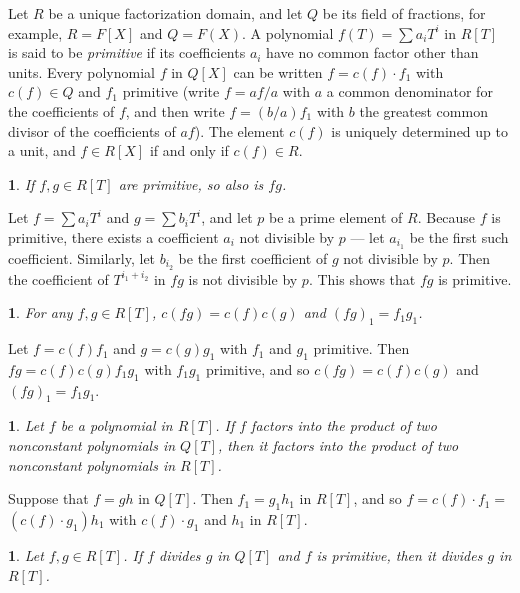 \documentclass[a4paper,11pt,final,openany]{memoir}
\newtheorem{E}[X]{}
\theoremstyle{nonumberplain}
\begin{document}
Let $R$ be a unique factorization domain, and let $Q$ be its field of
fractions, for example, $R=F[X]$ and $Q=F(X)$. A polynomial $f(T)=\sum
a_{i}T^{i}$ in $R[T]$ is said to be \emph{primitive}%
if its coefficients $a_{i}$ have no common factor other than units. Every
polynomial $f$ in $Q[X]$ can be written $f=c(f)\cdot f_{1}$ with $c(f)\in Q$
and $f_{1}$ primitive (write $f=af/a$ with $a$ a common denominator for the
coefficients of $f$, and then write $f=(b/a)f_{1}$ with $b$ the greatest
common divisor of the coefficients of $af$). The element $c(f)$ is uniquely
determined up to a unit, and $f\in R[X]$ if and only if $c(f)\in R$.

\begin{E}
\label{te16a}If $f,g\in R[T]$ are primitive, so also is $fg$.
\end{E}

\noindent Let $f=\sum a_{i}T^{i}$ and $g=\sum b_{i}T^{i}$, and let $p$ be a
prime element of $R$. Because $f$ is primitive, there exists a coefficient
$a_{i}$ not divisible by $p$ --- let $a_{i_{1}}$ be the first such
coefficient. Similarly, let $b_{i_{2}}$ be the first coefficient of $g$ not
divisible by $p$. Then the coefficient of $T^{i_{1}+i_{2}}$ in $fg$ is not
divisible by $p$. This shows that $fg$ is primitive.

\begin{E}
\label{te16b}For any $f,g\in R[T]$, $c(fg)=c(f)c(g)$ and $(fg)_{1}=f_{1}g_{1}$.
\end{E}

\noindent Let $f=c(f)f_{1}$ and $g=c(g)g_{1}$ with $f_{1}$ and $g_{1}$
primitive. Then $fg=c(f)c(g)f_{1}g_{1}$ with $f_{1}g_{1}$ primitive, and so
$c(fg)=c(f)c(g)$ and $(fg)_{1}=f_{1}g_{1}$.

\begin{E}
\label{te16c}Let $f$ be a polynomial in $R[T]$. If $f$ factors into the
product of two nonconstant polynomials in $Q[T]$, then it factors into the
product of two nonconstant polynomials in $R[T]$.
\end{E}

\noindent Suppose that $f=gh$ in $Q[T]$. Then $f_{1}=g_{1}h_{1}$ in $R[T]$,
and so $f=c(f)\cdot f_{1}=$ $(c(f)\cdot g_{1})h_{1}$ with $c(f)\cdot g_{1}$
and $h_{1}$ in $R[T]$.

\begin{E}
\label{te16d}Let $f,g\in R[T]$. If $f$ divides $g$ in $Q[T]$ and $f$ is
primitive, then it divides $g$ in $R[T]$.
\end{E}
\end{document}
